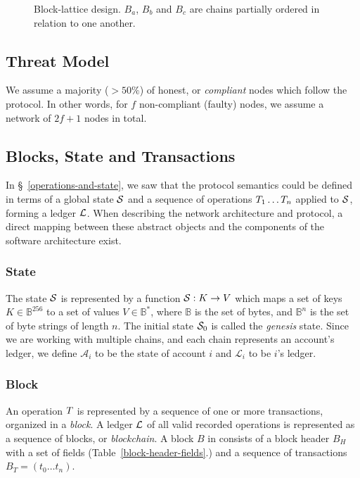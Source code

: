 \begin{figure*}[!ht]
    
    \caption{Block-lattice design. $B_a$, $B_b$ and $B_c$ are chains partially ordered in relation to one another.\label{block-lattice}}
\end{figure*}

\subsection{Threat Model}

We assume a majority ($> 50\%$) of honest, or \emph{compliant} nodes which follow
the protocol. In other words, for $f$ non-compliant (faulty) nodes, we assume a
network of $2f+1$ nodes in total.

\subsection{Blocks, State and Transactions}

In \S~\ref{operations-and-state}, we saw that the protocol semantics could
be defined in terms of a global state $\mathcal{S}$ and a sequence of operations
$T_1 \dotso T_n$ applied to $\mathcal{S}$, forming a ledger $\mathcal{L}$. When
describing the network architecture and protocol, a direct mapping between
these abstract objects and the components of the software architecture exist.

\subsubsection{State}

The state $\mathcal{S}$ is represented by a function $\mathcal{S} : K \to V$ which maps a
set of keys $K \in \mathbb{B}^{256}$ to a set of values $V \in \mathbb{B}^{*}$,
where $\mathbb{B}$ is the set of bytes, and $\mathbb{B}^n$ is the set of byte
strings of length $n$. The initial state $\mathcal{S}_0$ is called the
\emph{genesis} state. Since we are working with multiple chains, and each
chain represents an account's ledger, we define $\mathcal{A}_i$ to be the state
of account $i$ and $\mathcal{L}_i$ to be $i$'s ledger.

\subsubsection{Block}

An operation $T$ is represented by a sequence of one or more transactions,
organized in a \emph{block}. A ledger $\mathcal{L}$ of all valid recorded
operations is represented as a sequence of blocks, or \emph{blockchain}. A
block $B$ in \oscoin{} consists of a block header $B_H$ with a set of fields
(Table~\ref{block-header-fields}.) and a sequence of transactions $B_T = (t_0
\dotso t_n)$.

